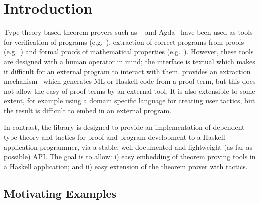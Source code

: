 \section{Introduction}


Type theory based theorem provers such as \Coq{}~\cite{coq-manual} and
Agda~\cite{agda} have been used as tools for verification of programs
(e.g.~\cite{leroy-compiler,why-tool,mckinna-expr}), extraction of
correct programs from proofs (e.g.~\cite{extraction-coq,large-extraction})
and formal proofs of mathematical properties
(e.g.~\cite{fta,four-colour}).  However, these tools are designed with a
human operator in mind; the interface is textual which makes it
difficult for an external program to interact with them. \Coq{}
provides an extraction mechanism~\cite{extraction-coq} which generates
ML or Haskell code from a proof term, but this does not allow the easy
 of proof terms by an external tool. It is also
extensible to some extent, for example using a domain specific
language for creating user tactics, but the result is difficult to
embed in an external program.


In contrast, the \Ivor{} library is designed to provide an
implementation of dependent type theory and tactics for proof and
program development to a Haskell application programmer, via a stable,
well-documented and lightweight (as far as possible) API. The goal is
to allow: i) easy embedding of theorem proving tools in a Haskell
application; and ii) easy extension of the theorem prover with
 tactics.


\subsection{Motivating Examples}

